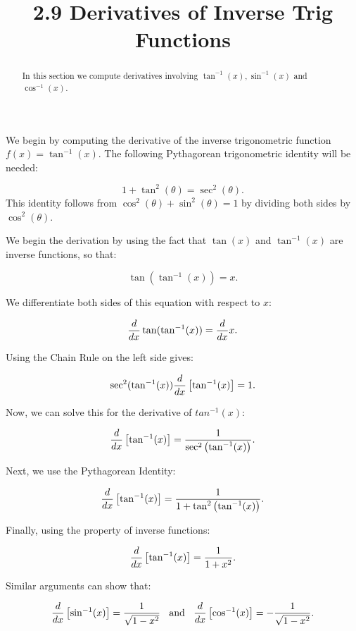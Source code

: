 \documentclass{ximera}
\title{2.9 Derivatives of Inverse Trig Functions}
\begin{document}
\begin{abstract}
In this section we compute derivatives involving $\tan^{-1}(x), \sin^{-1}(x)$ and $\cos^{-1}(x)$.
\end{abstract}

\maketitle


We begin by computing the derivative of the inverse trigonometric function $f(x) = \tan^{-1}(x)$.  
The following Pythagorean trigonometric identity will be needed:


\[
1 + \tan^2(\theta) = \sec^2(\theta).
\]
This identity follows from $\cos^2(\theta) + \sin^2(\theta) = 1$ by dividing both sides by $\cos^2(\theta)$.

We begin the derivation by using the fact that $\tan(x)$ and $\tan^{-1}(x)$ are inverse functions, so that:

\[
\tan(\tan^{-1}(x)) = x.
\]

We differentiate both sides of this equation with respect to $x$:

\[
\frac{\mathop{}\!d }{\mathop{}\!d x} \tan(\tan^{-1}(x)) = \frac{d}{\mathop{}\!d x} x.
\]

Using the Chain Rule on the left side gives:

\[
\sec^2(\tan^{-1}(x)) \frac{d}{\mathop{}\!d x} \left[\tan^{-1}(x)\right] = 1.
\]

Now, we can solve this for the derivative of $tan^{-1}(x)$:

\[
 \frac{d}{\mathop{}\!d x} \left[\tan^{-1}(x)\right] = \frac{1}{\sec^2\left(\tan^{-1}(x)\right)}.
\]

Next, we use the Pythagorean Identity:

\[
 \frac{d}{\mathop{}\!d x} \left[\tan^{-1}(x)\right] = \frac{1}{1 + \tan^2\left(\tan^{-1}(x)\right)}.
\]

Finally, using the property of inverse functions:

\[
 \frac{d}{\mathop{}\!d x} \left[\tan^{-1}(x)\right] = \frac{1}{1 + x^2}.
\]


Similar arguments can show that:

\[
 \frac{d}{\mathop{}\!d x} \left[\sin^{-1}(x)\right] = \frac{1}{\sqrt{1 - x^2}} \;\;\text{  and  } \;\;\frac{d}{\mathop{}\!d x} \left[\cos^{-1}(x)\right] = -\frac{1}{\sqrt{1 - x^2}}.
\]



\begin{foldable}
\end{foldable}
\end{document}
